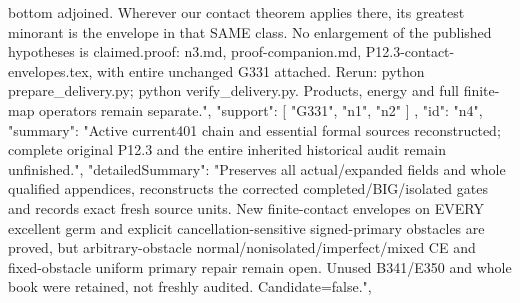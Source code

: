 \documentclass[11pt]{article}
\begin{document}
\begin{ActualFinalDATA}
{{bottom adjoined. Wherever our contact theorem applies there, its greatest minorant is the envelope in that SAME class. No enlargement of the published hypotheses is claimed.\n\nFull proof: n3.md, proof-companion.md, P12.3-contact-envelopes.tex, with entire unchanged G331 attached. Rerun: python prepare_delivery.py; python verify_delivery.py. Products, energy and full finite-map operators remain separate.\n",
      "support": [
        "G331",
        "n1",
        "n2"
      ]
    },
    {
      "id": "n4",
      "summary": "Active current401 chain and essential formal sources reconstructed; complete original P12.3 and the entire inherited historical audit remain unfinished.",
      "detailedSummary": "Preserves all actual/expanded fields and whole qualified appendices, reconstructs the corrected completed/BIG/isolated gates and records exact fresh source units. New finite-contact envelopes on EVERY excellent germ and explicit cancellation-sensitive signed-primary obstacles are proved, but arbitrary-obstacle normal/nonisolated/imperfect/mixed CE and fixed-obstacle uniform primary repair remain open. Unused B341/E350 and whole book were retained, not freshly audited. Candidate=false.",
}}
\end{ActualFinalDATA}
\end{document}
